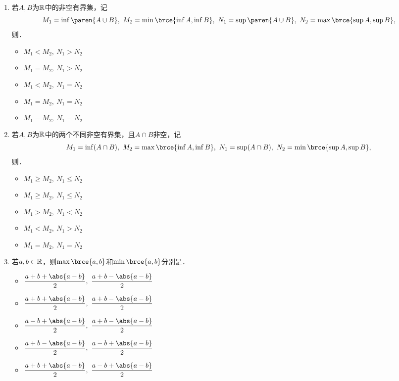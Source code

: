 \begin{enumerate}
\item 若\(A, B\)为\(\mathbb{R}\)中的非空有界集，记
  \begin{equation*}
    M_1 = \inf\paren{A \cup B},\ M_2 = \min\brce{\inf A, \inf B},\ N_1 = \sup\paren{A \cup B},\ N_2 = \max\brce{\sup A, \sup B},
  \end{equation*}
  则\uline{\hspace{8em}}．
  \begin{itemize}
    \renewcommand{\labelitemi}{\faCircleThin}
  \item \(M_1 < M_2,\ N_1 > N_2\)
  \item \(M_1 = M_2,\ N_1 > N_2\)
  \item \(M_1 < M_2,\ N_1 = N_2\)
    \ifshowsol
  \item[\faCircle] \(M_1 = M_2,\ N_1 = N_2\)
    \else
  \item \(M_1 = M_2,\ N_1 = N_2\)
    \fi
  \end{itemize}

\item 若\(A, B\)为\(\mathbb{R}\)中的两个不同非空有界集，且\(A \cap B\)非空，记
  \begin{equation*}
    M_1 = \inf(A \cap B),\ M_2 = \max\brce{\inf A, \inf B},\ N_1 = \sup(A \cap B),\ N_2 = \min\brce{\sup A, \sup B},
  \end{equation*}
  则\uline{\hspace{8em}}．
  \begin{itemize}
    \renewcommand{\labelitemi}{\faCircleThin}
    \ifshowsol
  \item[\faCircle] \(M_1 \ge M_2,\ N_1 \le N_2\)
    \else
  \item \(M_1 \ge M_2,\ N_1 \le N_2\)
    \fi
  \item \(M_1 > M_2,\ N_1 < N_2\)
  \item \(M_1 < M_2,\ N_1 > N_2\)
  \item \(M_1 = M_2,\ N_1 = N_2\)
  \end{itemize}

\item \label{B1.1.1.E9}若\(a, b \in \mathbb{R}\)，则\(\max\brce{a, b}\)和\(\min\brce{a, b}\)分别是\uline{\makebox[4em]{}}．
  \begin{itemize}
    \renewcommand{\labelitemi}{\faCircleThin}
    \ifshowsol
  \item[\faCircle] \(\displaystyle \frac{a+b+\abs{a-b}}{2},\ \frac{a+b-\abs{a-b}}{2}\)
    \else
  \item \(\displaystyle \frac{a+b+\abs{a-b}}{2},\ \frac{a+b-\abs{a-b}}{2}\)
    \fi
  \item \(\displaystyle \frac{a-b+\abs{a-b}}{2},\ \frac{a+b-\abs{a-b}}{2}\)
  \item \(\displaystyle \frac{a+b-\abs{a-b}}{2},\ \frac{a-b+\abs{a-b}}{2}\)
  \item \(\displaystyle \frac{a+b+\abs{a-b}}{2},\ \frac{a-b+\abs{a-b}}{2}\)
  \end{itemize}


\end{enumerate}
